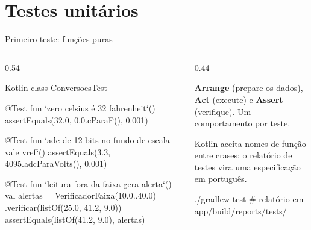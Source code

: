 \documentclass[aspectratio=169,10pt]{beamer}
\begin{document}
\section{Testes unitários}

\begin{frame}[fragile]{Primeiro teste: funções puras}
  \begin{columns}[T]
    \begin{column}{0.54\textwidth}
\begin{codigo}[title=src/test/.../ConversoesTest.kt]{Kotlin}
class ConversoesTest {

  @Test
  fun `zero celsius é 32 fahrenheit`() {
    assertEquals(32.0, 0.0.cParaF(), 0.001)
  }

  @Test
  fun `adc de 12 bits no fundo de escala vale vref`() {
    assertEquals(3.3, 4095.adcParaVolts(), 0.001)
  }

  @Test
  fun `leitura fora da faixa gera alerta`() {
    val alertas = VerificadorFaixa(10.0..40.0)
      .verificar(listOf(25.0, 41.2, 9.0))
    assertEquals(listOf(41.2, 9.0), alertas)
  }
}
\end{codigo}
    \end{column}
    \begin{column}{0.44\textwidth}
      \begin{conceito}
        \textbf{Arrange} (prepare os dados), \textbf{Act} (execute) e \textbf{Assert} (verifique). Um comportamento por teste.
      \end{conceito}
      \begin{dica}
        Kotlin aceita nomes de função entre crases: o relatório de testes vira uma especificação em português.
      \end{dica}
      \begin{terminal}[title=Executando]
./gradlew test
# relatório em app/build/reports/tests/
      \end{terminal}
    \end{column}
  \end{columns}
\end{frame}
\end{document}
